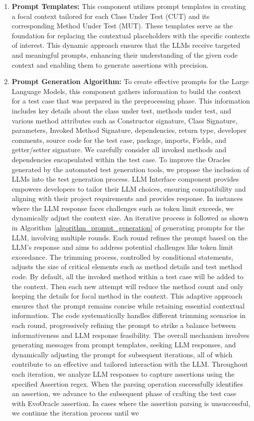     \begin{enumerate}
        \item \textbf{Prompt Templates:} This component utilizes prompt templates in creating a focal context tailored for each Class Under Test (CUT) and its corresponding Method Under Test (MUT). These templates serve as the foundation for replacing the contextual placeholders with the specific contexts of interest. This dynamic approach ensures that the LLMs receive targeted and meaningful prompts, enhancing their understanding of the given code context and enabling them to generate assertions with precision.

        \item \textbf{Prompt Generation Algorithm:} To create effective prompts for the Large Language Models, this component gathers information to build the context for a test case that was prepared in the preprocessing phase. This information includes key details about the class under test, methods under test, and various method attributes such as Constructor signature, Class Signature, parameters, Invoked Method Signature, dependencies, return type, developer comments, source code for the test case, package, imports, Fields, and getter/setter signature. We carefully consider all invoked methods and dependencies encapsulated within the test case. To improve the Oracles generated by the automated test generation tools, we propose the inclusion of LLMs into the test generation process. LLM Interface component provides empowers developers to tailor their LLM choices, ensuring compatibility and aligning with their project requirements and provides response. In instances where the LLM response faces challenges such as token limit exceeds, we dynamically adjust the context size. An iterative process is followed as shown in Algorithm~\ref{algorithm_prompt_generation} of generating prompts for the LLM, involving multiple rounds. Each round refines the prompt based on the LLM's response and aims to address potential challenges like token limit exceedance. The trimming process, controlled by conditional statements, adjusts the size of critical elements such as method details and test method code. By default, all the invoked method within a test case will be added to the context. Then each new attempt will reduce the method count and only keeping the details for focal method in the context. This adaptive approach ensures that the prompt remains concise while retaining essential contextual information. The code systematically handles different trimming scenarios in each round, progressively refining the prompt to strike a balance between informativeness and LLM response feasibility. The overall mechanism involves generating messages from prompt templates, seeking LLM responses, and dynamically adjusting the prompt for subsequent iterations, all of which contribute to an effective and tailored interaction with the LLM. Throughout each iteration, we analyze LLM responses to capture assertions using the specified Assertion regex. When the parsing operation successfully identifies an assertion, we advance to the subsequent phase of crafting the test case with EvoOracle assertion. In cases where the assertion parsing is unsuccessful, we continue the iteration process until we 
\end{enumerate}
